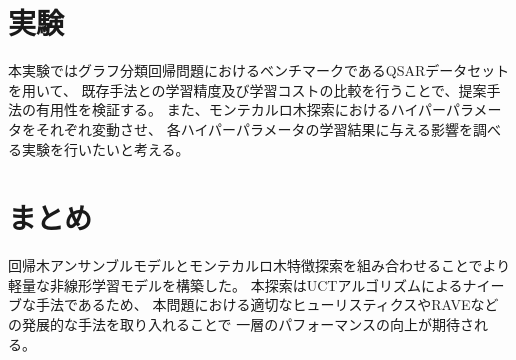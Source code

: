 \documentclass[a4paper,10.5pt]{jsarticle}           %
\begin{document}
\section{実験}
本実験ではグラフ分類回帰問題におけるベンチマークであるQSARデータセットを用いて、
既存手法との学習精度及び学習コストの比較を行うことで、提案手法の有用性を検証する。
また、モンテカルロ木探索におけるハイパーパラメータをそれぞれ変動させ、
各ハイパーパラメータの学習結果に与える影響を調べる実験を行いたいと考える。

\section{まとめ}
回帰木アンサンブルモデルとモンテカルロ木特徴探索を組み合わせることでより軽量な非線形学習モデルを構築した。
本探索はUCTアルゴリズムによるナイーブな手法であるため、
本問題における適切なヒューリスティクスやRAVEなどの発展的な手法を取り入れることで
一層のパフォーマンスの向上が期待される。

\small 

\end{document}
